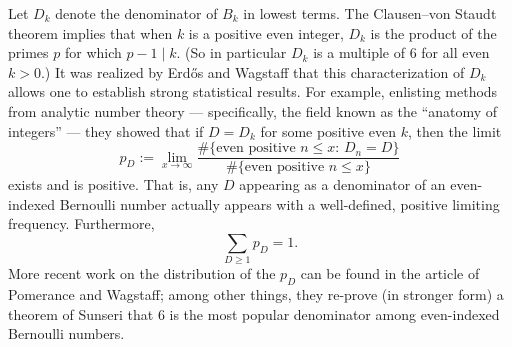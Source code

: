 \begin{rmk} Let $D_k$ denote the denominator of $B_k$ in lowest terms. The Clausen--von Staudt theorem implies that when $k$ is a positive even integer, $D_k$ is the product of the primes $p$ for which $p-1\mid k$. (So in particular $D_k$ is a multiple of $6$ for all even $k>0$.) It was realized by Erd\H{o}s and Wagstaff \cite{EW} that this characterization of $D_k$ allows one to establish strong statistical results. For example, enlisting methods from analytic number theory --- specifically, the field known as the ``anatomy of integers'' --- they showed that if $D = D_k$ for some positive even $k$, then the limit 
\[ p_D:=
\lim_{x\to\infty} 
\frac{\#\{\text{even positive $n\le x$: $D_n = D$}\}}{\#\{\text{even positive $n\le x$}\}} \]
exists and is positive. That is, any $D$ appearing as a denominator of an even-indexed Bernoulli number actually appears with a well-defined, positive limiting frequency. Furthermore, 
\[ \sum_{D\ge 1} p_D = 1. \]
More recent work on the distribution of the $p_D$ can be found in the article \cite{PW} of Pomerance and Wagstaff; among other things, they re-prove (in stronger form) a theorem of Sunseri that $6$ is the most popular denominator among even-indexed Bernoulli numbers. 
\end{rmk}

